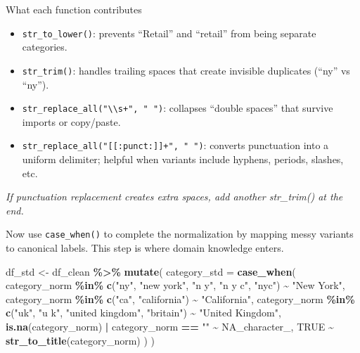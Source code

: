 \documentclass[
  11pt,
]{article}
\newenvironment{Shaded}{\begin{snugshade}}{\end{snugshade}}
\newcommand{\AttributeTok}[1]{\textcolor[rgb]{0.13,0.29,0.53}{#1}}
\newcommand{\ConstantTok}[1]{\textcolor[rgb]{0.56,0.35,0.01}{#1}}
\newcommand{\FunctionTok}[1]{\textcolor[rgb]{0.13,0.29,0.53}{\textbf{#1}}}
\newcommand{\NormalTok}[1]{#1}
\newcommand{\OtherTok}[1]{\textcolor[rgb]{0.56,0.35,0.01}{#1}}
\newcommand{\SpecialCharTok}[1]{\textcolor[rgb]{0.81,0.36,0.00}{\textbf{#1}}}
\newcommand{\StringTok}[1]{\textcolor[rgb]{0.31,0.60,0.02}{#1}}
\providecommand{\tightlist}{%
  \setlength{\itemsep}{0pt}\setlength{\parskip}{0pt}}
\begin{document}
What each function contributes

\begin{itemize}
\tightlist
\item
  \texttt{str\_to\_lower()}: prevents ``Retail'' and ``retail'' from
  being separate categories.
\item
  \texttt{str\_trim()}: handles trailing spaces that create invisible
  duplicates (``ny'' vs ``ny'').
\item
  \texttt{str\_replace\_all("\textbackslash{}\textbackslash{}s+",\ "\ ")}:
  collapses ``double spaces'' that survive imports or copy/paste.
\item
  \texttt{str\_replace\_all("{[}{[}:punct:{]}{]}+",\ "\ ")}: converts
  punctuation into a uniform delimiter; helpful when variants include
  hyphens, periods, slashes, etc.
\end{itemize}

\emph{If punctuation replacement creates extra spaces, add another
str\_trim() at the end.}

Now use \texttt{case\_when()} to complete the normalization by mapping
messy variants to canonical labels. This step is where domain knowledge
enters.

\begin{Shaded}
\begin{Highlighting}[]
\NormalTok{df\_std }\OtherTok{\textless{}{-}}\NormalTok{ df\_clean }\SpecialCharTok{\%\textgreater{}\%}
  \FunctionTok{mutate}\NormalTok{(}
    \AttributeTok{category\_std =} \FunctionTok{case\_when}\NormalTok{(}
\NormalTok{      category\_norm }\SpecialCharTok{\%in\%} \FunctionTok{c}\NormalTok{(}\StringTok{"ny"}\NormalTok{, }\StringTok{"new york"}\NormalTok{, }\StringTok{"n y"}\NormalTok{, }\StringTok{"n y c"}\NormalTok{, }\StringTok{"nyc"}\NormalTok{) }\SpecialCharTok{\textasciitilde{}} \StringTok{"New York"}\NormalTok{,}
\NormalTok{      category\_norm }\SpecialCharTok{\%in\%} \FunctionTok{c}\NormalTok{(}\StringTok{"ca"}\NormalTok{, }\StringTok{"california"}\NormalTok{)                     }\SpecialCharTok{\textasciitilde{}} \StringTok{"California"}\NormalTok{,}
\NormalTok{      category\_norm }\SpecialCharTok{\%in\%} \FunctionTok{c}\NormalTok{(}\StringTok{"uk"}\NormalTok{, }\StringTok{"u k"}\NormalTok{, }\StringTok{"united kingdom"}\NormalTok{, }\StringTok{"britain"}\NormalTok{) }\SpecialCharTok{\textasciitilde{}} \StringTok{"United Kingdom"}\NormalTok{,}
      \FunctionTok{is.na}\NormalTok{(category\_norm) }\SpecialCharTok{|}\NormalTok{ category\_norm }\SpecialCharTok{==} \StringTok{""}                   \SpecialCharTok{\textasciitilde{}} \ConstantTok{NA\_character\_}\NormalTok{,}
      \ConstantTok{TRUE}                                                         \SpecialCharTok{\textasciitilde{}} \FunctionTok{str\_to\_title}\NormalTok{(category\_norm)}
\NormalTok{    )}
\NormalTok{  )}
\end{Highlighting}
\end{Shaded}
\end{document}
